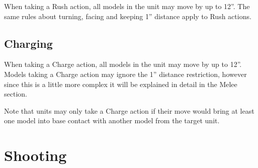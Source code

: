 \documentclass[9pt, a4paper, bookmarks=false]{extarticle}            %
\begin{document}
\begin{multicols}{2}
When taking a Rush action, all models in the unit may move by up to 12”. The same rules about turning, facing and keeping 1” distance apply to Rush actions.

\subsection{Charging}

When taking a Charge action, all models in the unit may move by up to 12”. Models taking a Charge action may ignore the 1” distance restriction, however since this is a little more complex it will be explained in detail in the Melee section.

Note that units may only take a Charge action if their move would bring at least one model into base contact with another model from the target unit.

\end{multicols}


\newpage



\section{Shooting}
\end{document}
